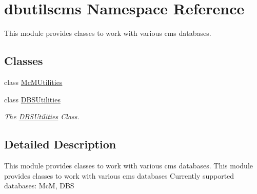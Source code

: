 \section{dbutilscms Namespace Reference}
\label{namespacedbutilscms}


This module provides classes to work with various cms databases.  


\subsection*{Classes}
\begin{DoxyCompactItemize}
\item 
class \hyperlink{classdbutilscms_1_1McMUtilities}{Mc\-M\-Utilities}
\item 
class \hyperlink{classdbutilscms_1_1DBSUtilities}{D\-B\-S\-Utilities}
\begin{DoxyCompactList}\small\item\em The \hyperlink{classdbutilscms_1_1DBSUtilities}{D\-B\-S\-Utilities} Class. \end{DoxyCompactList}\end{DoxyCompactItemize}


\subsection{Detailed Description}
This module provides classes to work with various cms databases. This module provides classes to work with various cms databases Currently supported databases\-: Mc\-M, D\-B\-S 
